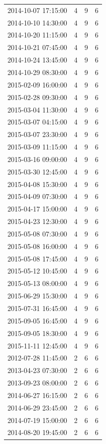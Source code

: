 \begin{tabular}{lrrr}
2014-10-07 17:15:00 & 4 & 9 & 6 \\
2014-10-10 14:30:00 & 4 & 9 & 6 \\
2014-10-20 11:15:00 & 4 & 9 & 6 \\
2014-10-21 07:45:00 & 4 & 9 & 6 \\
2014-10-24 13:45:00 & 4 & 9 & 6 \\
2014-10-29 08:30:00 & 4 & 9 & 6 \\
2015-02-09 16:00:00 & 4 & 9 & 6 \\
2015-02-28 09:30:00 & 4 & 9 & 6 \\
2015-03-04 11:30:00 & 4 & 9 & 6 \\
2015-03-07 04:15:00 & 4 & 9 & 6 \\
2015-03-07 23:30:00 & 4 & 9 & 6 \\
2015-03-09 11:15:00 & 4 & 9 & 6 \\
2015-03-16 09:00:00 & 4 & 9 & 6 \\
2015-03-30 12:45:00 & 4 & 9 & 6 \\
2015-04-08 15:30:00 & 4 & 9 & 6 \\
2015-04-09 07:30:00 & 4 & 9 & 6 \\
2015-04-17 15:00:00 & 4 & 9 & 6 \\
2015-04-23 12:30:00 & 4 & 9 & 6 \\
2015-05-08 07:30:00 & 4 & 9 & 6 \\
2015-05-08 16:00:00 & 4 & 9 & 6 \\
2015-05-08 17:45:00 & 4 & 9 & 6 \\
2015-05-12 10:45:00 & 4 & 9 & 6 \\
2015-05-13 08:00:00 & 4 & 9 & 6 \\
2015-06-29 15:30:00 & 4 & 9 & 6 \\
2015-07-31 16:45:00 & 4 & 9 & 6 \\
2015-09-05 16:45:00 & 4 & 9 & 6 \\
2015-09-05 18:30:00 & 4 & 9 & 6 \\
2015-11-11 12:45:00 & 4 & 9 & 6 \\
2012-07-28 11:45:00 & 2 & 6 & 6 \\
2013-04-23 07:30:00 & 2 & 6 & 6 \\
2013-09-23 08:00:00 & 2 & 6 & 6 \\
2014-06-27 16:15:00 & 2 & 6 & 6 \\
2014-06-29 23:45:00 & 2 & 6 & 6 \\
2014-07-19 15:00:00 & 2 & 6 & 6 \\
2014-08-20 19:45:00 & 2 & 6 & 6 \\

\end{tabular}
